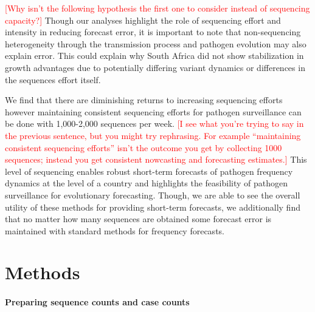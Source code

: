 \documentclass[11pt,oneside,letterpaper]{article}
\def\jhc#1{\textcolor{red}{[#1]}}
\begin{document}
\jhc{Why isn't the following hypothesis the first one to consider instead of sequencing capacity?}
Though our analyses highlight the role of sequencing effort and intensity in reducing forecast error, it is important to note that non-sequencing heterogeneity through the transmission process and pathogen evolution may also explain error.
This could explain why South Africa did not show stabilization in growth advantages due to potentially differing variant dynamics or differences in the sequences effort itself.


We find that there are diminishing returns to increasing sequencing efforts however maintaining consistent sequencing efforts for pathogen surveillance can be done with 1,000-2,000 sequences per week.
\jhc{I see what you're trying to say in the previous sentence, but you might try rephrasing. For example ``maintaining consistent sequencing efforts'' isn't the outcome you get by collecting 1000 sequences; instead you get consistent nowcasting and forecasting estimates.}
This level of sequencing enables robust short-term forecasts of pathogen frequency dynamics at the level of a country and highlights the feasibility of pathogen surveillance for evolutionary forecasting.
Though, we are able to see the overall utility of these methods for providing short-term forecasts, we additionally find that no matter how many sequences are obtained some forecast error is maintained with standard methods for frequency forecasts.


\section*{Methods}

\paragraph{Preparing sequence counts and case counts}
\end{document}
